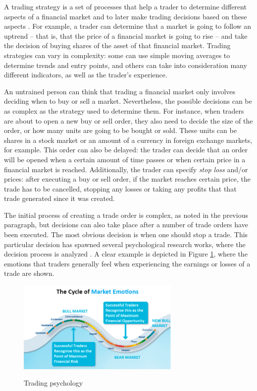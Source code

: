 A trading strategy is a set of processes that help a trader to determine
different aspects of a financial market and to later make trading decisions
based on these aspects \cite{Kendall2003}. For example, a trader can determine
that a market is going to follow an uptrend -- that is, that the price of a
financial market is going to rise -- and take the decision of buying shares of
the asset of that financial market. Trading strategies can vary in complexity:
some can use simple moving averages to determine trends and entry points, and
others can take into consideration many different indicators, as well as the
trader's experience.

An untrained person can think that trading a financial market only involves
deciding when to buy or sell a market. Nevertheless, the possible decisions can
be as complex as the strategy used to determine them. For instance, when traders
are about to open a new buy or sell order, they also need to decide the size of
the order, or how many units are going to be bought or sold. These units can be
shares in a stock market or an amount of a currency in foreign exchange markets,
for example. This order can also be delayed: the trader can decide that an order
will be opened when a certain amount of time passes or when certain price in a
financial market is reached. Additionally, the trader can specify \textit{stop
  loss} and/or  prices: after executing a buy or sell order,
if the market reaches certain price, the trade has to be cancelled, stopping any
losses or taking any profits that that trade generated since it was created.

The initial process of creating a trade order is complex, as noted in the
previous paragraph, but decisions can also take place after a number of trade
orders have been executed. The most obvious decision is when one should stop a
trade. This particular decision has spawned several psychological research
works, where the decision process is analyzed \cite{Maranon2018}. A clear
example is depicted in Figure \ref{figure:trading-psychology}, where the
emotions that traders generally feel when experiencing the earnings or losses of
a trade are shown.

\begin{figure}
\caption{Trading psychology}
\centering
\includegraphics[width=0.7\textwidth]{img/trading-psychology.png}
\label{figure:trading-psychology}
\end{figure}

